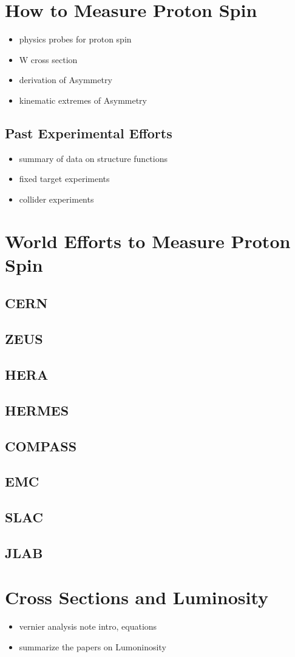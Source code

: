 \section{How to Measure Proton Spin}
\begin{itemize}
		\item physics probes for proton spin
		\item W cross section
		\item derivation of Asymmetry
		\item kinematic extremes of Asymmetry
\end{itemize}
\subsection{Past Experimental Efforts}
\begin{itemize}
		\item summary of data on structure functions
		\item fixed target experiments
		\item collider experiments
\end{itemize}

\section{World Efforts to Measure Proton Spin}
\subsection{CERN}
\subsection{ZEUS}
\subsection{HERA}
\subsection{HERMES}
\subsection{COMPASS}
\subsection{EMC}
\subsection{SLAC}
\subsection{JLAB}

\section{Cross Sections and Luminosity}
\begin{itemize}
		\item vernier analysis note intro, equations
		\item summarize the papers on Lumoninosity
\end{itemize}
